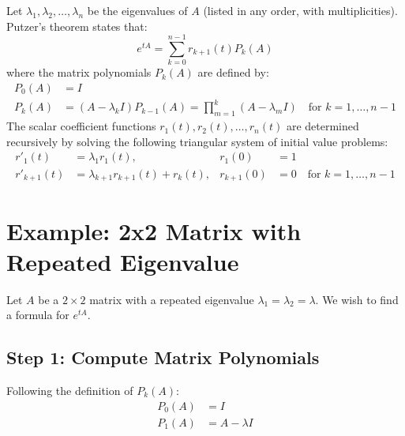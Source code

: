 \documentclass[12pt,a4paper]{report}
\theoremstyle{definition}
\numberwithin{equation}{chapter}
\begin{document}
Let $\lambda_1, \lambda_2, \ldots, \lambda_n$ be the eigenvalues of $A$ (listed in any order, with multiplicities). Putzer's theorem states that:
\begin{equation}
e^{tA} = \sum_{k=0}^{n-1} r_{k+1}(t) P_k(A)
\end{equation}
where the matrix polynomials $P_k(A)$ are defined by:
\begin{equation}
\begin{aligned}
P_0(A) &= I \\
P_k(A) &= (A - \lambda_k I)P_{k-1}(A) = \prod_{m=1}^k (A - \lambda_m I) \quad \text{for } k = 1, \ldots, n-1
\end{aligned}
\end{equation}
The scalar coefficient functions $r_1(t), r_2(t), \ldots, r_n(t)$ are determined recursively by solving the following triangular system of initial value problems:
\begin{align}
r'_1(t) &= \lambda_1 r_1(t), & r_1(0) &= 1 \\
r'_{k+1}(t) &= \lambda_{k+1} r_{k+1}(t) + r_k(t), & r_{k+1}(0) &= 0 \quad \text{for } k = 1, \ldots, n-1
\end{align}

\section{Example: 2x2 Matrix with Repeated Eigenvalue}
Let $A$ be a $2 \times 2$ matrix with a repeated eigenvalue $\lambda_1 = \lambda_2 = \lambda$. We wish to find a formula for $e^{tA}$.

\subsection*{Step 1: Compute Matrix Polynomials}
Following the definition of $P_k(A)$:
\begin{equation}
\begin{aligned}
P_0(A) &= I \\
P_1(A) &= A - \lambda I
\end{aligned}
\end{equation}
\end{document}

